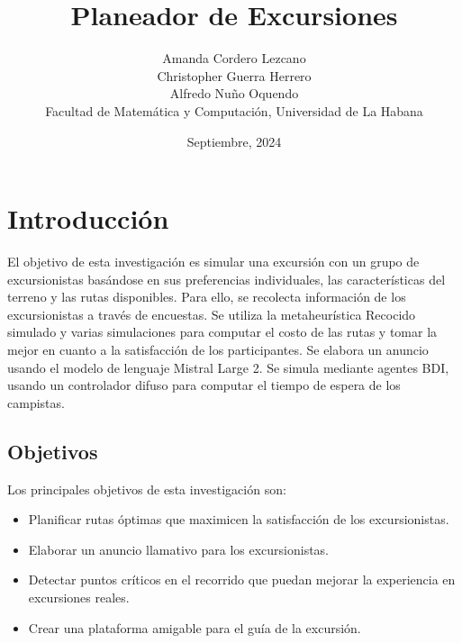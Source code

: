\documentclass[10pt,twocolumn]{article}
\begin{document}
	\title{Planeador de Excursiones}
	\author{
		Amanda Cordero Lezcano\\
		Christopher Guerra Herrero\\
		Alfredo Nuño Oquendo\\Facultad de Matemática y Computación, Universidad de La Habana
	}
	\date{Septiembre, 2024}
	
	\section{Introducción}
	El objetivo de esta investigación es simular una excursión con un grupo de excursionistas basándose en sus preferencias individuales, las características del terreno y las rutas disponibles. Para ello, se recolecta información de los excursionistas a través de encuestas. Se utiliza la metaheur\'istica Recocido simulado y varias simulaciones para computar el costo de las rutas y tomar la mejor en cuanto a la satisfacción de los participantes. Se elabora un anuncio usando el modelo de lenguaje Mistral Large 2. Se simula mediante agentes BDI, usando un controlador difuso para computar el tiempo de espera de los campistas.
	
	\subsection{Objetivos}
	Los principales objetivos de esta investigación son:
	\begin{itemize}
		\item Planificar rutas óptimas que maximicen la satisfacción de los excursionistas.
		\item Elaborar un anuncio llamativo para los excursionistas.
		\item Detectar puntos críticos en el recorrido que puedan mejorar la experiencia en excursiones reales.
		\item Crear una plataforma amigable para el guía de la excursión.
	\end{itemize}
	
\end{document}
